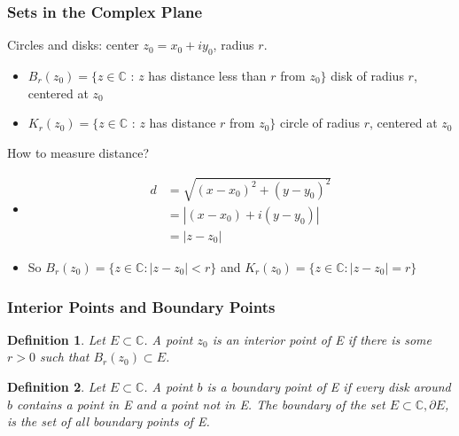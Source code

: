 \documentclass{article}
\newtheorem{definition}{Definition}[section]
\begin{document}
\subsubsection{Sets in the Complex Plane}
Circles and disks: center $z_0 = x_0 + iy_0$, radius $r$.
\begin{itemize}
\item $B_{r}(z_0) = \{ z \in \mathbb{C}$ : $z$ has distance less than $r$ from $z_0 \}$ disk of radius $r$, centered at $z_0$
\item $K_{r}(z_0) = \{ z \in \mathbb{C}$ : $z$ has distance $r$ from $z_0 \}$ circle of radius $r$, centered at $z_0$
\end{itemize}
How to measure distance?
\begin{itemize}
\item
\begin{align*}
d &= \sqrt{(x - x_0)^2 + (y - y_0)^2} \\
&= \left|(x - x_0) + i(y - y_0)\right| \\
&= \left|z - z_0\right|
\end{align*}
\item So $B_r(z_0) = \{ z \in \mathbb{C} : \left|z - z_0\right| < r \}$ and $K_r(z_0) = \{ z \in \mathbb{C} : \left|z - z_0\right| = r\}$
\end{itemize}

\subsubsection{Interior Points and Boundary Points}
\begin{definition}
Let $E \subset \mathbb{C}$. A point $z_0$ is an interior point of E if there is some $r > 0$ such that $B_r(z_0) \subset E$.
\end{definition}
\begin{definition}
Let $E \subset \mathbb{C}$. A point $b$ is a boundary point of E if every disk around $b$ contains a point in E and a point not in E.
The boundary of the set $E \subset \mathbb{C}, \partial E$, is the set of all boundary points of E.
\end{definition}
\end{document}
